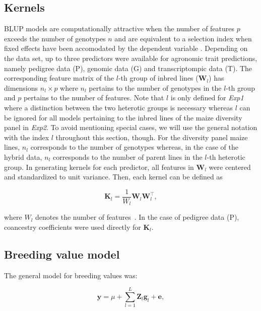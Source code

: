 \documentclass[12pt,titlepage]{article}
\begin{document}
\subsection{Kernels}
BLUP models are computationally attractive when the number of features $p$
exceeds the number of genotypes $n$ and are equivalent to a selection index
when fixed effects have been accomodated by the dependent variable 
\cite{Mrode2014}.
Depending on the data set, up to three predictors were available for agronomic
trait predictions, namely pedigree data (P), genomic data (G) and
transcriptompic data (T).
The corresponding feature matrix of the $l$-th group of inbred lines 
($\mathbf{W}_{l}$) has dimensions $n_{l} \times p$ where $n_{l}$ pertains to 
the number of genotypes in the $l$-th group and $p$ pertains to the number of 
features.
Note that $l$ is only defined for \textit{Exp1} where a distinction between 
the two heterotic groups is necessary whereas $l$ can be ignored for all 
models pertaining to the inbred lines of the maize diversity panel in 
\textit{Exp2}.
To avoid mentioning special cases, we will use the general notation with 
the index $l$ throughout this section, though.
For the diversity panel maize lines, $n_{l}$ corresponds to the number of 
genotypes whereas, in the case of the hybrid data, $n_{l}$ corresponds to the 
number of parent lines in the $l$-th heterotic group.
In generating kernels for each predictor, all features in $\mathbf{W}_{l}$ were
centered and standardized to unit variance.
Then, each kernel can be defined as

\begin{equation} \label{eq:GenomicRelationship}
  \mathbf{K}_{l} = \frac{1}{W_{l}} \mathbf{W}_{l} \mathbf{W}_{l}^{\top},
\end{equation}

where $W_{l}$ denotes the number of features~\cite{VanRaden2008}.
In the case of pedigree data (P), coancestry coefficients were used directly
for $\mathbf{K}_{l}$.





\subsection{Breeding value model}
The general model for breeding values was:

\begin{equation} \label{eq:KBLUPModel}
  \mathbf{y} = \mu + 
  \sum_{l=1}^{L} \mathbf{Z}_{l} \mathbf{g}_{l} + \mathbf{e},
\end{equation}
\end{document}
